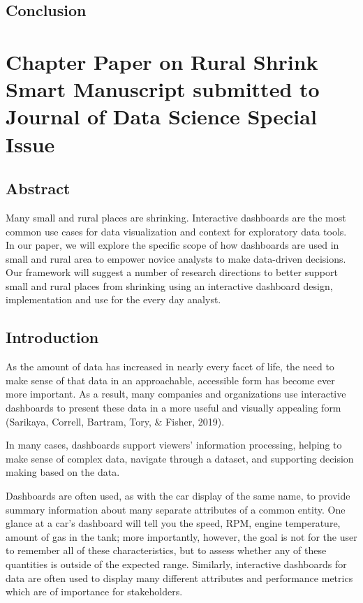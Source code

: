 \documentclass[print]{nuthesis}
\begin{document}
\hypertarget{conclusion}{%
\section{Conclusion}\label{conclusion}}

\hypertarget{rmd-basics}{%
\chapter{Chapter Paper on Rural Shrink Smart Manuscript submitted to Journal of Data Science Special Issue}\label{rmd-basics}}

\hypertarget{abstract}{%
\section{Abstract}\label{abstract}}

Many small and rural places are shrinking. Interactive dashboards are the most common use cases for data visualization and context for exploratory data tools. In our paper, we will explore the specific scope of how dashboards are used in small and rural area to empower novice analysts to make data-driven decisions. Our framework will suggest a number of research directions to better support small and rural places from shrinking using an interactive dashboard design, implementation and use for the every day analyst.

\hypertarget{introduction-1}{%
\section{Introduction}\label{introduction-1}}

As the amount of data has increased in nearly every facet of life, the need to make sense of that data in an approachable, accessible form has become ever more important.
As a result, many companies and organizations use interactive dashboards to present these data in a more useful and visually appealing form (Sarikaya, Correll, Bartram, Tory, \& Fisher, 2019).

In many cases, dashboards support viewers' information processing, helping to make sense of complex data, navigate through a dataset, and supporting decision making based on the data.

Dashboards are often used, as with the car display of the same name, to provide summary information about many separate attributes of a common entity. One glance at a car's dashboard will tell you the speed, RPM, engine temperature, amount of gas in the tank; more importantly, however, the goal is not for the user to remember all of these characteristics, but to assess whether any of these quantities is outside of the expected range.
Similarly, interactive dashboards for data are often used to display many different attributes and performance metrics which are of importance for stakeholders.
\end{document}
